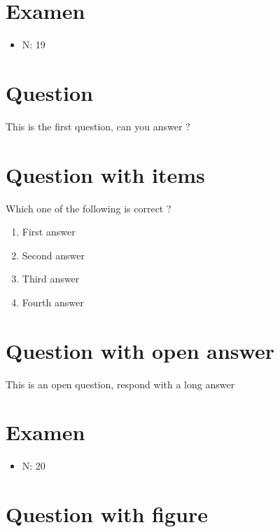 \documentclass[a4paper,11pt,twoside]{article}
\begin{document}
\section*{Examen}
\label{sec:orgc6880ff}
\begin{itemize}
\item N: 19
\end{itemize}
\section*{Question}
\label{sec:org9bc1ad3}

This is the first question, can you answer ?



\section*{Question with items}
\label{sec:orgf1b95ff}

Which one of the following is correct ?

\begin{enumerate}
\item First answer
\item Second answer
\item Third answer
\item Fourth answer
\end{enumerate}



\section*{Question with open answer}
\label{sec:org87444ca}

This is an open question, respond with a long answer


\subsection*{}
\label{sec:org207f96f}

\cleardoublepage

\section*{Examen}
\label{sec:orgd3f8cda}
\begin{itemize}
\item N: 20
\end{itemize}
\section*{Question with figure}
\label{sec:orgde0dae3}
\end{document}

